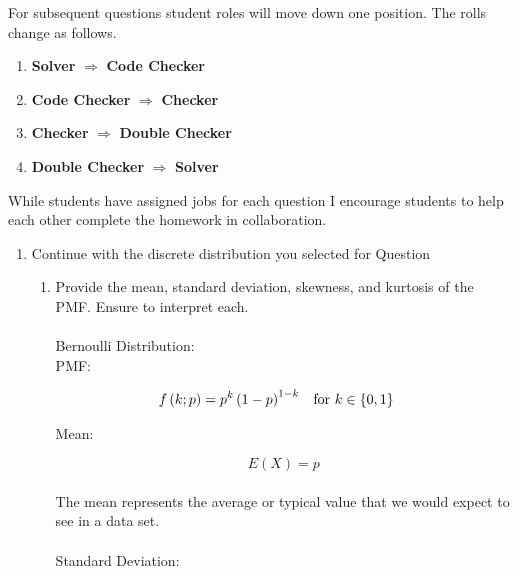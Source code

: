 \documentclass{article}\usepackage[]{graphicx}\usepackage[]{color}
\begin{document}
\noindent For subsequent questions student roles will move down one position. The rolls change as follows.
\begin{enumerate}
  \item \textbf{Solver} $\Longrightarrow$ \textbf{Code Checker}
  \item \textbf{Code Checker} $\Longrightarrow$ \textbf{Checker}
  \item \textbf{Checker} $\Longrightarrow$ \textbf{Double Checker}
  \item \textbf{Double Checker} $\Longrightarrow$ \textbf{Solver}
\end{enumerate}
While students have assigned jobs for each question I encourage students to help 
each other complete the homework in collaboration.
\newpage
\begin{enumerate}
\item Continue with the discrete distribution you selected for Question %
\begin{enumerate}
  \item Provide the mean, standard deviation, skewness, and kurtosis of the PMF. 
  Ensure to interpret each.
\\
\\
Bernoulli Distribution:
\\



PMF:

\begin{align*}f\left(k;p\right) & =p^{k}\left(1-p\right)^{1-k} &  & \textrm{for \ensuremath{k\in\left\{ 0,1\right\} }}\end{align*}


Mean:

\[
E(X)=p
\]
\\
The mean represents the average or typical value that we would expect to see in a data set.\\
\\
Standard Deviation:


\end{enumerate}
\end{enumerate}
\end{document}
